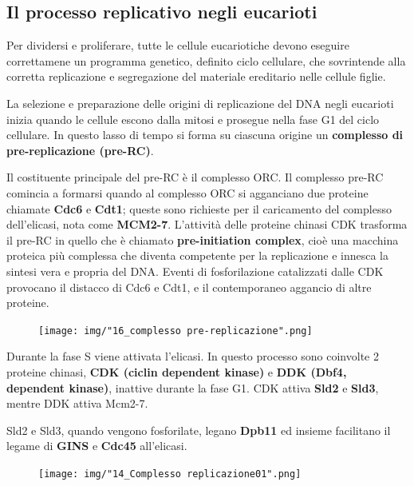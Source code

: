 \documentclass[11pt]{book}
\begin{document}
\subsection{Il processo replicativo negli
eucarioti}\label{il-processo-replicativo-negli-eucarioti}

Per dividersi e proliferare, tutte le cellule eucariotiche devono
eseguire correttamene un programma genetico, definito ciclo cellulare,
che sovrintende alla corretta replicazione e segregazione del materiale
ereditario nelle cellule figlie.

La selezione e preparazione delle origini di replicazione del DNA negli
eucarioti inizia quando le cellule escono dalla mitosi e prosegue nella
fase G1 del ciclo cellulare. In questo lasso di tempo si forma su
ciascuna origine un \textbf{complesso di pre-replicazione (pre-RC)}.

Il costituente principale del pre-RC è il complesso ORC. Il complesso
pre-RC comincia a formarsi quando al complesso ORC si agganciano due
proteine chiamate \textbf{Cdc6} e \textbf{Cdt1}; queste sono richieste
per il caricamento del complesso dell'elicasi, nota come
\textbf{MCM2-7}. L'attività delle proteine chinasi CDK trasforma il
pre-RC in quello che è chiamato \textbf{pre-initiation complex}, cioè
una macchina proteica più complessa che diventa competente per la
replicazione e innesca la sintesi vera e propria del DNA. Eventi di
fosforilazione catalizzati dalle CDK provocano il distacco di Cdc6 e
Cdt1, e il contemporaneo aggancio di altre proteine.

\begin{figure}[htp]
\centering
\texttt{[image: img/"16\_complesso pre-replicazione".png]}
\caption{}
\label{complesso-pre-replicazione}
\end{figure}

Durante la fase S viene attivata l'elicasi. In questo processo sono
coinvolte 2 proteine chinasi, \textbf{CDK (ciclin dependent kinase)} e
\textbf{DDK (Dbf4, dependent kinase)}, inattive durante la fase G1. CDK
attiva \textbf{Sld2} e \textbf{Sld3}, mentre DDK attiva Mcm2-7.

Sld2 e Sld3, quando vengono fosforilate, legano \textbf{Dpb11} ed
insieme facilitano il legame di \textbf{GINS} e \textbf{Cdc45}
all'elicasi.

\begin{figure}[htp]
\centering
\texttt{[image: img/"14\_Complesso replicazione01".png]}
\caption{}
\label{complesso-replicazione01}
\end{figure}
\end{document}
